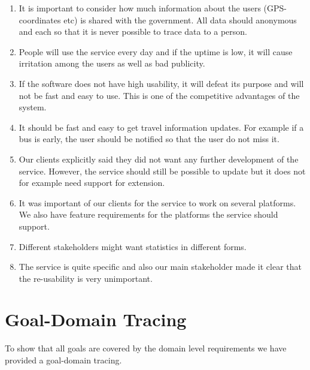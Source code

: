 \documentclass[a4paper]{article}
\begin{document}
		\begin{enumerate}
  			\item It is important to consider how much information about the users (GPS-coordinates etc) is shared with the government.	All data should anonymous and each so that it is never possible to trace data to a person.
  			\item People will use the service every day and if the uptime is low, it will cause irritation among the users as well as bad publicity.
  			\item If the software does not have high usability, it will defeat its purpose and will not be fast and easy to use. This is one of the competitive advantages of the system.
  			\item It should be fast and easy to get travel information updates. For example if a bus is early, the user should be notified so that the user do not miss it.
  			\item Our clients explicitly said they did not want any further development of the service. However, the service should still be possible to update but it does not for example need support for extension.
  			\item It was important of our clients for the service to work on several platforms. We also have feature requirements for the platforms the service should support.
  			\item Different stakeholders might want statistics in different forms.
  			\item The service is quite specific and also our main stakeholder made it clear that the re-usability is very unimportant.	
		\end{enumerate}

	
	\section{Goal-Domain Tracing}
	 To show that all goals are covered by the domain level requirements we have provided a goal-domain tracing. \\
				
\end{document}
